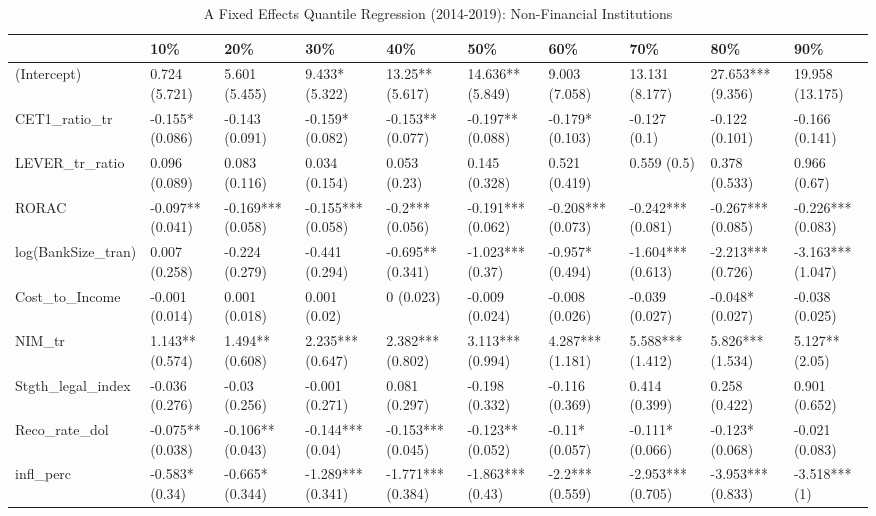 \begin{table}[ht]
\centering
\caption{A Fixed Effects Quantile Regression (2014-2019): Non-Financial Institutions} 
\begingroup\small
\begin{tabular}{llllllllll}
  \toprule
 & 10\% & 20\% & 30\% & 40\% & 50\% & 60\% & 70\% & 80\% & 90\% \\ 
  \midrule
(Intercept) & 0.724 (5.721) & 5.601 (5.455) & 9.433* (5.322) & 13.25** (5.617) & 14.636** (5.849) & 9.003 (7.058) & 13.131 (8.177) & 27.653*** (9.356) & 19.958 (13.175) \\ 
  CET1\_ratio\_tr & -0.155* (0.086) & -0.143 (0.091) & -0.159* (0.082) & -0.153** (0.077) & -0.197** (0.088) & -0.179* (0.103) & -0.127 (0.1) & -0.122 (0.101) & -0.166 (0.141) \\ 
  LEVER\_tr\_ratio & 0.096 (0.089) & 0.083 (0.116) & 0.034 (0.154) & 0.053 (0.23) & 0.145 (0.328) & 0.521 (0.419) & 0.559 (0.5) & 0.378 (0.533) & 0.966 (0.67) \\ 
  RORAC & -0.097** (0.041) & -0.169*** (0.058) & -0.155*** (0.058) & -0.2*** (0.056) & -0.191*** (0.062) & -0.208*** (0.073) & -0.242*** (0.081) & -0.267*** (0.085) & -0.226*** (0.083) \\ 
  log(BankSize\_tran) & 0.007 (0.258) & -0.224 (0.279) & -0.441 (0.294) & -0.695** (0.341) & -1.023*** (0.37) & -0.957* (0.494) & -1.604*** (0.613) & -2.213*** (0.726) & -3.163*** (1.047) \\ 
  Cost\_to\_Income & -0.001 (0.014) & 0.001 (0.018) & 0.001 (0.02) & 0 (0.023) & -0.009 (0.024) & -0.008 (0.026) & -0.039 (0.027) & -0.048* (0.027) & -0.038 (0.025) \\ 
  NIM\_tr & 1.143** (0.574) & 1.494** (0.608) & 2.235*** (0.647) & 2.382*** (0.802) & 3.113*** (0.994) & 4.287*** (1.181) & 5.588*** (1.412) & 5.826*** (1.534) & 5.127** (2.05) \\ 
  Stgth\_legal\_index & -0.036 (0.276) & -0.03 (0.256) & -0.001 (0.271) & 0.081 (0.297) & -0.198 (0.332) & -0.116 (0.369) & 0.414 (0.399) & 0.258 (0.422) & 0.901 (0.652) \\ 
  Reco\_rate\_dol & -0.075** (0.038) & -0.106** (0.043) & -0.144*** (0.04) & -0.153*** (0.045) & -0.123** (0.052) & -0.11* (0.057) & -0.111* (0.066) & -0.123* (0.068) & -0.021 (0.083) \\ 
  infl\_perc & -0.583* (0.34) & -0.665* (0.344) & -1.289*** (0.341) & -1.771*** (0.384) & -1.863*** (0.43) & -2.2*** (0.559) & -2.953*** (0.705) & -3.953*** (0.833) & -3.518*** (1) \\ 

\end{tabular}
\end{table}
